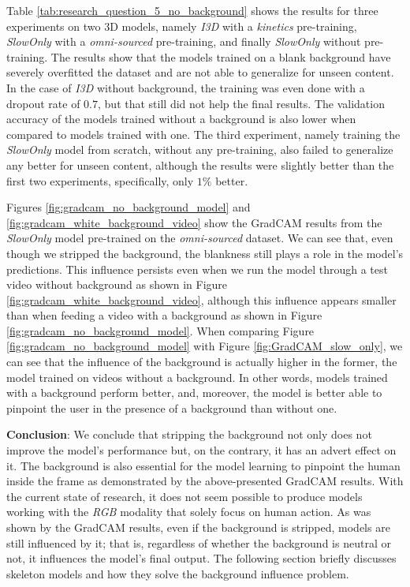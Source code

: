 \documentclass[extern,palatino]{cgMA}
\begin{document}
\bigskip
\noindent Table \ref{tab:research_question_5_no_background} shows the results for three experiments on two 3D models, namely \textit{I3D} with a \textit{kinetics} pre-training, \textit{SlowOnly} with a \textit{omni-sourced} pre-training, and finally \textit{SlowOnly} without pre-training. The results show that the models trained on a blank background have severely overfitted the dataset and are not able to generalize for unseen content. In the case of \textit{I3D} without background, the training was even done with a dropout rate of $0.7$, but that still did not help the final results. The validation accuracy of the models trained without a background is also lower when compared to models trained with one. The third experiment, namely training the \textit{SlowOnly} model from scratch, without any pre-training, also failed to generalize any better for unseen content, although the results were slightly better than the first two experiments, specifically, only $1\%$ better.

Figures \ref{fig:gradcam_no_background_model} and \ref{fig:gradcam_white_background_video} show the GradCAM results from the \textit{SlowOnly} model pre-trained on the \textit{omni-sourced} dataset. We can see that, even though we stripped the background, the blankness still plays a role in the model's predictions. This influence persists even when we run the model through a test video without background as shown in Figure \ref{fig:gradcam_white_background_video}, although this influence appears smaller than when feeding a video with a background as shown in Figure \ref{fig:gradcam_no_background_model}. When comparing Figure \ref{fig:gradcam_no_background_model} with Figure \ref{fig:GradCAM_slow_only}, we can see that the influence of the background is actually higher in the former, the model trained on videos without a background. In other words, models trained with a background perform better, and, moreover, the model is better able to pinpoint the user in the presence of a background than without one.

\bigskip
\noindent \textbf{Conclusion}: We conclude that stripping the background not only does not improve the model's performance but, on the contrary, it has an advert effect on it. The background is also essential for the model learning to pinpoint the human inside the frame as demonstrated by the above-presented GradCAM results. With the current state of research, it does not seem possible to produce models working with the \textit{RGB} modality that solely focus on human action. As was shown by the GradCAM results, even if the background is stripped, models are still influenced by it; that is, regardless of whether the background is neutral or not, it influences the model's final output. The following section briefly discusses skeleton models and how they solve the background influence problem. 
 
\end{document}
